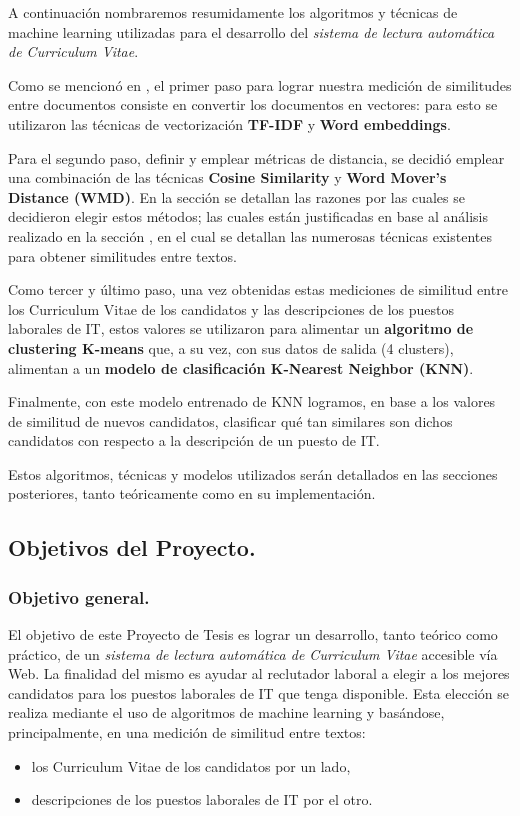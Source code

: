 \documentclass[12pt,a4paper]{article}
\begin{document}
\begin{sloppypar}
A continuación nombraremos resumidamente los algoritmos y técnicas de machine learning utilizadas para el desarrollo del \textit{sistema de lectura automática de Curriculum Vitae}. 

Como se mencionó en \textit{}, el primer paso para lograr nuestra medición de similitudes entre documentos consiste en convertir los documentos en vectores: para esto se utilizaron las técnicas de vectorización \textbf{TF-IDF} y \textbf{Word embeddings}.

Para el segundo paso, definir y emplear métricas de distancia, se decidió emplear una combinación de las técnicas \textbf{Cosine Similarity} y \textbf{Word Mover’s Distance (WMD)}. En la sección \textit{} se detallan las razones por las cuales se decidieron elegir estos métodos; las cuales están justificadas en base al análisis realizado en la sección \textit{}, en el cual se detallan las numerosas técnicas existentes para obtener similitudes entre textos.

Como tercer y último paso, una vez obtenidas estas mediciones de similitud entre los Curriculum Vitae de los candidatos y las descripciones de los puestos laborales de IT, estos valores se utilizaron para alimentar un \textbf{algoritmo de clustering K-means} que, a su vez, con sus datos de salida (4 clusters), alimentan a un \textbf{modelo de clasificación K-Nearest Neighbor (KNN)}.

Finalmente, con este modelo entrenado de KNN logramos, en base a los valores de similitud de nuevos candidatos, clasificar qué tan similares son dichos candidatos con respecto a la descripción de un puesto de IT.

Estos algoritmos, técnicas y modelos utilizados serán detallados en las secciones posteriores, tanto teóricamente como en su implementación. 

\cleardoublepage    %

\subsection{Objetivos del Proyecto.}

\subsubsection{Objetivo general.}

El objetivo de este Proyecto de Tesis es lograr un desarrollo, tanto teórico como práctico, de un \textit{sistema de lectura automática de Curriculum Vitae} accesible vía Web. La finalidad del mismo es ayudar al reclutador laboral a elegir a los mejores candidatos para los puestos laborales de IT que tenga disponible. Esta elección se realiza mediante el uso de algoritmos de machine learning y basándose, principalmente, en una medición de similitud entre textos:  
\begin{itemize}
\item los Curriculum Vitae de los candidatos por un lado, 
\item descripciones de los puestos laborales de IT por el otro.
\end{itemize} 


\end{sloppypar}
\end{document}
